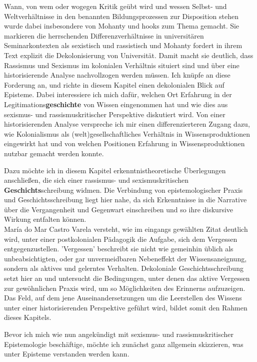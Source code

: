 Wann, von wem oder wogegen Kritik geübt wird und wessen Selbst- und
Weltverhältnisse in den benannten Bildungsprozessen zur Disposition stehen wurde
dabei insbesondere von Mohanty und hooks zum Thema gemacht. Sie markieren die
herrschenden Differenzverhältnisse in universitären Seminarkontexten als
sexistisch und rassistisch und Mohanty fordert in ihrem Text explizit die
Dekolonisierung von Universität. Damit macht sie deutlich, dass Rassismus und
Sexismus im kolonialen Verhältnis situiert sind und über eine historisierende
Analyse nachvollzogen werden müssen. Ich knüpfe an diese Forderung an, und
richte in diesem Kapitel einen dekolonialen Blick auf Episteme. Dabei
interessiere ich mich dafür, welchen Ort Erfahrung in der
Legitimations\textbf{geschichte} von Wissen eingenommen hat und wie dies aus sexismus-
und rassismuskritischer Perspektive diskutiert wird. Von einer historisierenden
Analyse verspreche ich mir einen differenzierteren Zugang dazu, wie
Kolonialismus als (welt)gesellschaftliches Verhältnis in Wissensproduktionen
eingewirkt hat und von welchen Positionen Erfahrung in Wissensproduktionen
nutzbar gemacht werden konnte.

Dazu möchte ich in diesem Kapitel erkenntnistheoretische Überlegungen
anschließen, die sich einer rassismus- und sexismuskritischen
\textbf{Geschichts}schreibung widmen. Die Verbindung von  epistemologischer Praxis und
Geschichtsschreibung liegt hier nahe, da sich Erkenntnisse in die Narrative
über die Vergangenheit und Gegenwart einschreiben und so ihre diskursive Wirkung
entfalten können.
\\
María do Mar Castro Varela versteht, wie im eingangs gewählten Zitat deutlich
wird, unter einer postkolonialen Pädagogik die Aufgabe, sich dem Vergessen
entgegenzustellen. 'Vergessen' beschreibt sie nicht wie gemeinhin üblich als
unbeabsichtigten, oder gar unvermeidbaren Nebeneffekt der Wissensaneignung,
sondern als aktives und gelerntes Verhalten. Dekoloniale Geschichtsschreibung
setzt hier an und untersucht die Bedingungen, unter denen das aktive Vergessen
zur gewöhnlichen Praxis wird, um so Möglichkeiten des Erinnerns aufzuzeigen. Das
Feld, auf dem jene Auseinandersetzungen um die Leerstellen des Wissens unter
einer historisierenden Perspektive geführt wird, bildet somit den Rahmen dieses
Kapitels.

Bevor ich mich wie nun angekündigt mit sexismus- und rassismuskritischer
Epistemologie beschäftige, möchte ich zunächst ganz allgemein skizzieren, was
unter Episteme verstanden werden kann.\\

